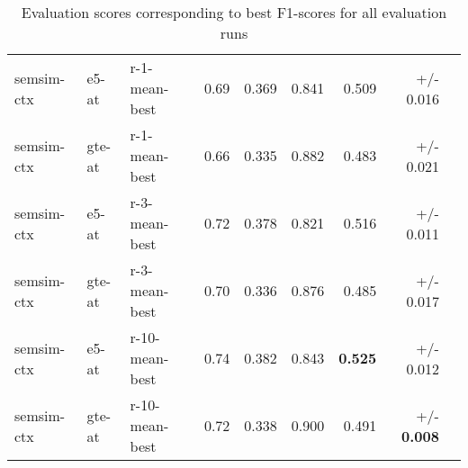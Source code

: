 \documentclass[11pt, numbers=noenddot]{scrreprt}
\begin{document}
\begin{table}[htp]
\begin{tabular}{lllrrrrrr}
\hline
semsim-ctx & e5-at & r-1-mean-best & 0.69 & 0.369 & 0.841 & 0.509 & +/- 0.016 \\
semsim-ctx & gte-at & r-1-mean-best & 0.66 & 0.335 & 0.882 & 0.483 & +/- 0.021 \\
semsim-ctx & e5-at & r-3-mean-best & 0.72 & 0.378 & 0.821 & 0.516 & +/- 0.011 \\
semsim-ctx & gte-at & r-3-mean-best & 0.70 & 0.336 & 0.876 & 0.485 & +/- 0.017 \\
semsim-ctx & e5-at & r-10-mean-best & 0.74 & 0.382 & 0.843 & \textbf{0.525} & +/- 0.012 \\
semsim-ctx & gte-at & r-10-mean-best & 0.72 & 0.338 & 0.900 & 0.491 & +/- \textbf{0.008} \\
\bottomrule
\end{tabular}
\caption{Evaluation scores corresponding to best F1-scores for all evaluation runs}
\label{tab:best-f1-score-mean-best}
\end{table}
\end{document}
